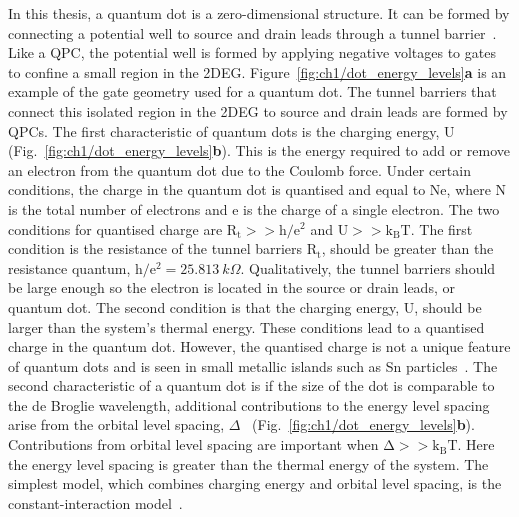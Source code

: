 In this thesis, a quantum dot is a zero-dimensional structure. It can be formed by connecting a potential well to source and drain leads through a tunnel barrier~\cite{spins_in_qd}. Like a QPC, the potential well is formed by applying negative voltages to gates to confine a small region in the 2DEG. Figure~\ref{fig:ch1/dot_energy_levels}\textbf{a} is an example of the gate geometry used for a quantum dot. The tunnel barriers that connect this isolated region in the 2DEG to source and drain leads are formed by QPCs. The first characteristic of quantum dots is the charging energy, $\mathrm{U}$ (Fig.~\ref{fig:ch1/dot_energy_levels}\textbf{b}). This is the energy required to add or remove an electron from the quantum dot due to the Coulomb force. 
Under certain conditions, the charge in the quantum dot is quantised and equal to $\mathrm{Ne}$, where $\mathrm{N}$ is the total number of electrons and $\mathrm{e}$ is the charge of a single electron. The two conditions for quantised charge are $\mathrm{R_t}>>\mathrm{h/e^2}$ and $\mathrm{U}>>\mathrm{k_BT}$. The first condition is the resistance of the tunnel barriers $\mathrm{R_t}$, should be greater than the resistance quantum, $\mathrm{h/e^2}=\qty{25.813}{k\Omega}$. Qualitatively, the tunnel barriers should be large enough so the electron is located in the source or drain leads, or quantum dot. The second condition is that the charging energy, $\mathrm{U}$, should be larger than the system's thermal energy. These conditions lead to a quantised charge in the quantum dot. However, the quantised charge is not a unique feature of quantum dots and is seen in small metallic islands such as Sn particles~\cite{first_quantised_charge}.
The second characteristic of a quantum dot is if the size of the dot is comparable to the de Broglie wavelength, additional contributions to the energy level spacing arise from the orbital level spacing, $\Delta$~\cite{Kouwenhoven_1997_electron_transport, spins_in_qd} (Fig.~\ref{fig:ch1/dot_energy_levels}\textbf{b}). 
Contributions from orbital level spacing are important when $\mathrm{\Delta}>>\mathrm{k_BT}$. Here the energy level spacing is greater than the thermal energy of the system. The simplest model, which combines charging energy and orbital level spacing, is the constant-interaction model~\cite{Beenakker1991_constant_interaction}.

